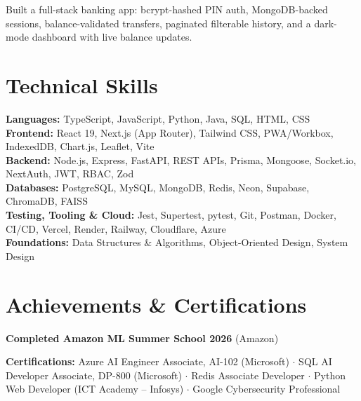 \documentclass[a4paper,10pt]{article}
\begin{document}
\begin{points}
  \item Built a full-stack banking app: bcrypt-hashed PIN auth, MongoDB-backed sessions, balance-validated transfers, paginated filterable history, and a dark-mode dashboard with live balance updates.
\end{points}

\section{Technical Skills}
{\small
\textbf{Languages:} TypeScript, JavaScript, Python, Java, SQL, HTML, CSS\\
\textbf{Frontend:} React 19, Next.js (App Router), Tailwind CSS, PWA/Workbox, IndexedDB, Chart.js, Leaflet, Vite\\
\textbf{Backend:} Node.js, Express, FastAPI, REST APIs, Prisma, Mongoose, Socket.io, NextAuth, JWT, RBAC, Zod\\
\textbf{Databases:} PostgreSQL, MySQL, MongoDB, Redis, Neon, Supabase, ChromaDB, FAISS\\
\textbf{Testing, Tooling \& Cloud:} Jest, Supertest, pytest, Git, Postman, Docker, CI/CD, Vercel, Render, Railway, Cloudflare, Azure\\
\textbf{Foundations:} Data Structures \& Algorithms, Object-Oriented Design, System Design}

\section{Achievements \& Certifications}
\begin{points}
  \item \ieeepaper
  \item \textbf{Completed Amazon ML Summer School 2026} (Amazon)
\end{points}
\vspace{2pt}
{\small\textbf{Certifications:} Azure AI Engineer Associate, AI-102 (Microsoft) $\cdot$ SQL AI Developer Associate, DP-800 (Microsoft) $\cdot$ Redis Associate Developer $\cdot$ Python Web Developer (ICT Academy -- Infosys) $\cdot$ Google Cybersecurity Professional}
\end{document}
